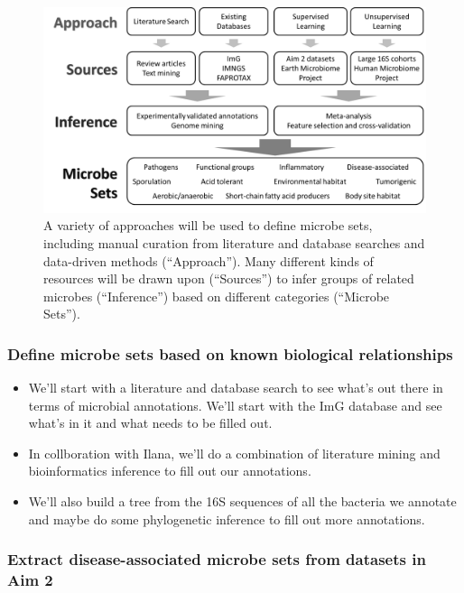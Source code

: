 \documentclass[12pt]{article}
\begin{document}
\begin{figure}[H]
\begin{center}
	\includegraphics[scale=0.5]{microbe_sets}
	\caption{A variety of approaches will be used to define
	microbe sets, including manual curation from literature
	and database searches and data-driven methods (``Approach'').
	Many different kinds of resources will be drawn upon 
	(``Sources'') to infer groups of related microbes 
	(``Inference'') based on different categories 
	(``Microbe Sets'').}
	\label{fig:microbe_sets}
\end{center}
\end{figure}


\subsubsection{Define microbe sets based on known biological relationships}

\begin{itemize}
\item We'll start with a literature and database search to see what's out there in terms 
of microbial annotations. We'll start with the ImG database and see what's in it and 
what needs to be filled out.
\item In collboration with Ilana, we'll do a combination of literature mining and 
bioinformatics inference to fill out our annotations.
\item We'll also build a tree from the 16S sequences of all the bacteria we annotate and 
maybe do some phylogenetic inference to fill out more annotations.
\end{itemize}

\subsubsection{Extract disease-associated microbe sets from datasets in Aim 2}
\end{document}
